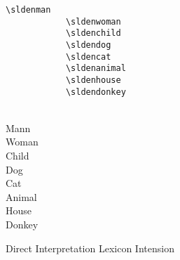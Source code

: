 \documentclass[10pt, a4paper]{article}
\begin{document}
	\begin{center}
		\begin{minipage}[h][3.5cm][t]{15em}
			\begin{lstlisting}[style=B]
			\sldenman
			\sldenwoman
			\sldenchild
			\sldendog
			\sldencat
			\sldenanimal
			\sldenhouse
			\sldendonkey
			\end{lstlisting}
		\end{minipage}
		\begin{minipage}[h][3.5cm][t]{15em}
			\begin{fgls}
				\ \\
				Mann\\
				Woman\\
				Child\\
				Dog\\
				Cat\\
				Animal\\
				House\\
				Donkey
			\end{fgls}
		\end{minipage}
	\end{center}
	\newpage
	Direct Interpretation Lexicon Intension
\end{document}
